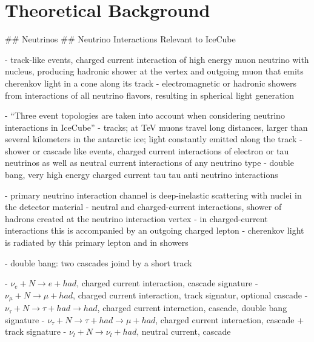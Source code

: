 
\section{Theoretical Background}
\label{sec:theoretical_background}

## Neutrinos
## Neutrino Interactions Relevant to IceCube

- track-like events, charged current interaction of high energy muon neutrino with nucleus, producing hadronic shower at the vertex and outgoing muon that emits cherenkov light in a cone along its track \cite{instrumentation}
- electromagnetic or hadronic showers from interactions of all neutrino flavors, resulting in spherical light generation \cite{instrumentation}

- \enquote{Three event topologies are taken into account when considering neutrino interactions in IceCube} \cite{skysearch}
  - tracks; at TeV muons travel long distances, larger than several kilometers in the antarctic ice; light constantly emitted along the track \cite{skysearch,mmc}
  - shower or cascade like events, charged current interactions of electron or tau neutrinos as well as neutral current interactions of any neutrino type \cite{skysearch}
  - double bang, very high energy charged current tau tau anti neutrino interactions \cite{skysearch}

- primary neutrino interaction channel is deep-inelastic scattering with nuclei in the detector material \cite{energyreco}
- neutral and charged-current interactions, shower of hadrons created at the neutrino interaction vertex \cite{energyreco}
- in charged-current interactions this is accompanied by an outgoing charged lepton \cite{energyreco}
- cherenkov light is radiated by this primary lepton and in showers \cite{energyreco}

- double bang: two cascades joind by a short track \cite{energyreco}

- $\nu_e + N \rightarrow e + had$, charged current interaction, cascade signature \cite{energyreco}
- $\nu_\mu + N \rightarrow \mu + had$, charged current interaction, track signatur, optional cascade \cite{energyreco}
- $\nu_\tau + N \rightarrow \tau + had \rightarrow had$, charged current interaction, cascade, double bang signature \cite{energyreco}
- $\nu_\tau + N \rightarrow \tau + had \rightarrow \mu + had$, charged current interaction, cascade + track signature \cite{energyreco}
- $\nu_l + N \rightarrow \nu_l + had$, neutral current, cascade \cite{energyreco}


